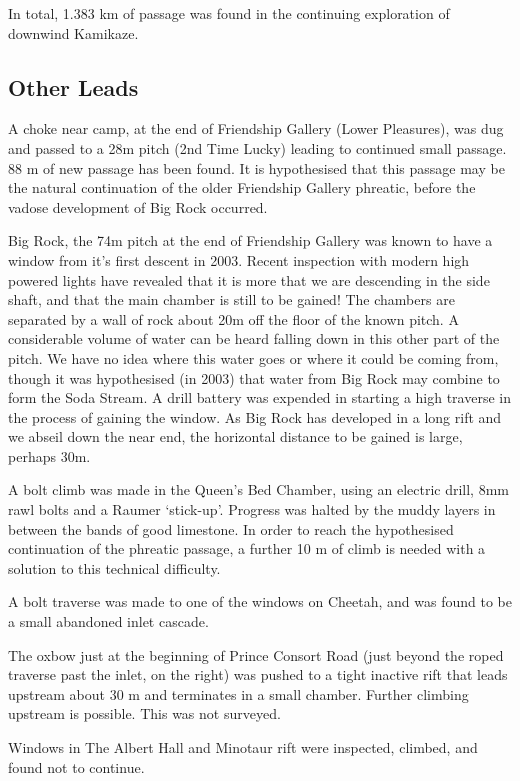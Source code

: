 In total, 1.383 km of passage was found in the continuing exploration of
downwind Kamikaze.

\subsection{Other Leads}\label{other-leads}

A choke near camp, at the end of Friendship Gallery (Lower Pleasures),
was dug and passed to a 28m pitch (2nd Time Lucky) leading to continued
small passage. 88 m of new passage has been found. It is hypothesised
that this passage may be the natural continuation of the older
Friendship Gallery phreatic, before the vadose development of Big Rock
occurred.

Big Rock, the 74m pitch at the end of Friendship Gallery was known to
have a window from it's first descent in 2003. Recent inspection with
modern high powered lights have revealed that it is more that we are
descending in the side shaft, and that the main chamber is still to be
gained! The chambers are separated by a wall of rock about 20m off the
floor of the known pitch. A considerable volume of water can be heard
falling down in this other part of the pitch. We have no idea where this
water goes or where it could be coming from, though it was hypothesised
(in 2003) that water from Big Rock may combine to form the Soda Stream.
A drill battery was expended in starting a high traverse in the process
of gaining the window. As Big Rock has developed in a long rift and we
abseil down the near end, the horizontal distance to be gained is large,
perhaps 30m.

A bolt climb was made in the Queen's Bed Chamber, using an electric
drill, 8mm rawl bolts and a Raumer `stick-up'. Progress was halted by
the muddy layers in between the bands of good limestone. In order to
reach the hypothesised continuation of the phreatic passage, a further
10 m of climb is needed with a solution to this technical difficulty.

A bolt traverse was made to one of the windows on Cheetah, and was found
to be a small abandoned inlet cascade.

The oxbow just at the beginning of Prince Consort Road (just beyond the
roped traverse past the inlet, on the right) was pushed to a tight
inactive rift that leads upstream about 30 m and terminates in a small
chamber. Further climbing upstream is possible. This was not surveyed.

Windows in The Albert Hall and Minotaur rift were inspected, climbed,
and found not to continue.

